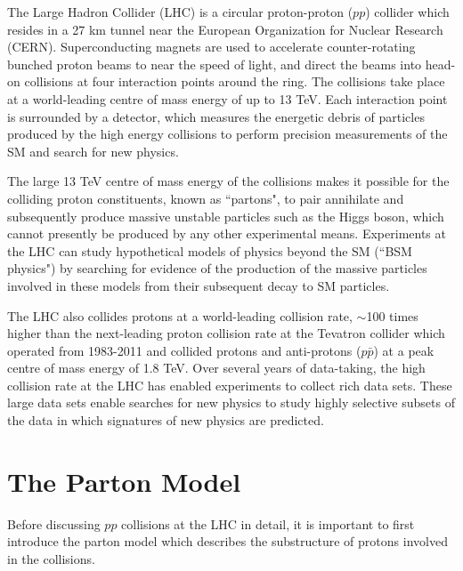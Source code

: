 \label{chapter:lhc_atlas}

The Large Hadron Collider (LHC) \cite{lhc_machine} is a circular proton-proton (\(pp\)) collider which resides in a 27 km tunnel near the European Organization for Nuclear Research (CERN). Superconducting magnets are used to accelerate counter-rotating bunched proton beams to near the speed of light, and direct the beams into head-on collisions at four interaction points around the ring. The collisions take place at a world-leading centre of mass energy of up to 13 TeV. Each interaction point is surrounded by a detector, which measures the energetic debris of particles produced by the high energy collisions to perform precision measurements of the SM and search for new physics.

The large 13 TeV centre of mass energy of the collisions makes it possible for the colliding proton constituents, known as ``partons", to pair annihilate and subsequently produce massive unstable particles such as the Higgs boson, which cannot presently be produced by any other experimental means. Experiments at the LHC can study hypothetical models of physics beyond the SM (``BSM physics") by searching for evidence of the production of the massive particles involved in these models from their subsequent decay to SM particles.

The LHC also collides protons at a world-leading collision rate, \(\sim\)100 times higher than the next-leading proton collision rate at the Tevatron collider \cite{tevatron} which operated from 1983-2011 and collided protons and anti-protons (\(p\bar{p}\)) at a peak centre of mass energy of 1.8 TeV. Over several years of data-taking, the high collision rate at the LHC has enabled experiments to collect rich data sets. These large data sets enable searches for new physics to study highly selective subsets of the data in which signatures of new physics are predicted.

\section{The Parton Model}
\label{sec:parton_model}

Before discussing \(pp\) collisions at the LHC in detail, it is important to first introduce the parton model which describes the substructure of protons involved in the collisions. 


